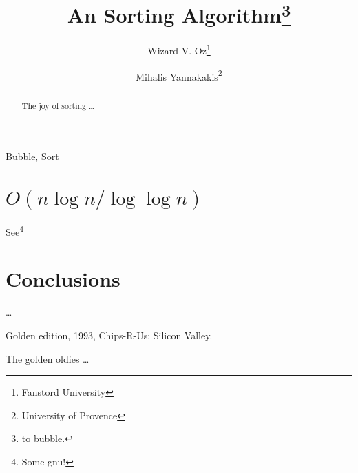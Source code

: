 
\author{Wizard V. Oz\thanks{Fanstord University}
       \and Mihalis Yannakakis\thanks{University of Provence}}
\title{An Sorting Algorithm\thanks{to bubble.}}

\maketitle

\begin{keywords}
Bubble, Sort
\end{keywords}


\begin{abstract}
The joy of sorting \dots
\end{abstract}


\smalltableofcontents

\section{$O(n \log n / \! \log\log n)$}

 See\footnote{Some gnu!}

\section{Conclusions}

\cite{phdthesis-full} \dots




\newpage{}
Golden edition, 1993, Chips-R-Us: Silicon Valley. 

\bigskip
The golden oldies \dots





